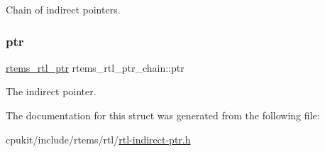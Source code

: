 Chain of indirect pointers. \mbox{\label{structrtems__rtl__ptr__chain_a36868f3df93b3a89745e67304f49774c}} 
\subsubsection{\texorpdfstring{ptr}{ptr}}
{\footnotesize\ttfamily \mbox{\hyperlink{structrtems__rtl__ptr}{rtems\+\_\+rtl\+\_\+ptr}} rtems\+\_\+rtl\+\_\+ptr\+\_\+chain\+::ptr}

The indirect pointer. 

The documentation for this struct was generated from the following file\+:\begin{DoxyCompactItemize}
\item 
cpukit/include/rtems/rtl/\mbox{\hyperlink{rtl-indirect-ptr_8h}{rtl-\/indirect-\/ptr.\+h}}\end{DoxyCompactItemize}
